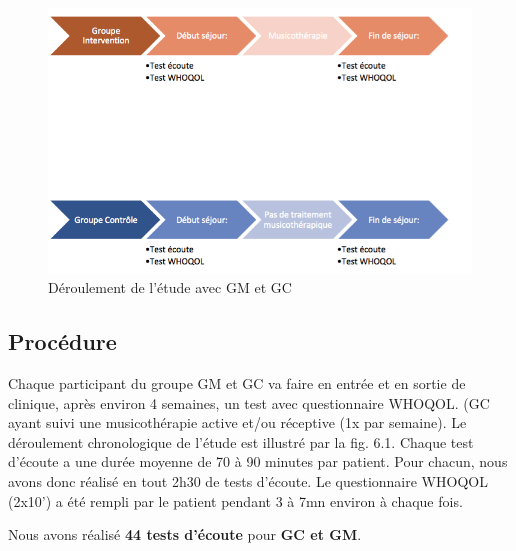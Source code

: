         \begin{figure}[hb]
\centering
\includegraphics[width=0.7\linewidth]{images/Groupecontrole.png}
\caption[Schéma du déroulement]{Déroulement de l'étude avec GM et GC}
       
\label{groupecontroleimage1}
\end{figure}
	
 \subsection{Procédure}
Chaque participant du groupe GM et GC va faire en entrée et en sortie de
clinique, après environ 4 semaines, un
          test avec questionnaire  WHOQOL. (GC ayant suivi une musicothérapie active et/ou réceptive (1x par
        semaine).
          Le déroulement chronologique de l'étude est illustré par la fig. 6.1.
          Chaque test d'écoute a une durée  moyenne de
        70 à 90 minutes par patient. Pour chacun, nous avons donc réalisé
        en tout 2h30 de tests d'écoute.
        Le questionnaire WHOQOL (2x10')  a été rempli par le
        patient pendant 3 à 7mn environ à chaque fois.

        Nous avons réalisé \textbf{44 tests d'écoute} pour \textbf{GC et GM}.
 
